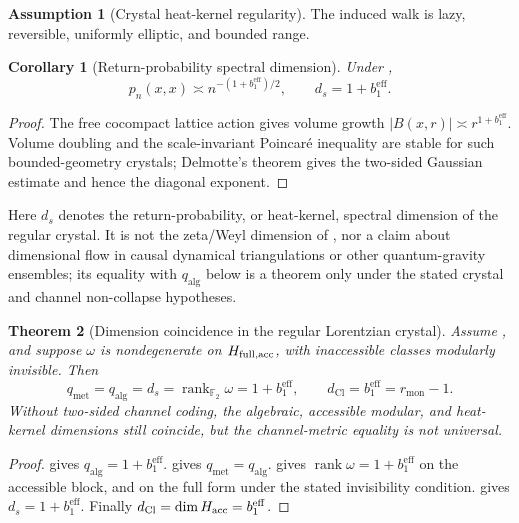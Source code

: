 \documentclass[11pt]{article}
\newtheorem{theorem}{Theorem}[section]
\newtheorem{corollary}[theorem]{Corollary}
\theoremstyle{definition}
\newtheorem{assumption}{Assumption}[section]
\theoremstyle{remark}
\newcommand{\F}{\mathbb{F}}
\newcommand{\qalg}{q_{\mathrm{alg}}}
\newcommand{\qmet}{q_{\mathrm{met}}}
\newcommand{\rmon}{r_{\mathrm{mon}}}
\newcommand{\dCl}{d_{\mathrm{Cl}}}
\newcommand{\ds}{d_s}
\newcommand{\beff}{b_1^{\mathrm{eff}}}
\newcommand{\rank}{\operatorname{rank}}
\begin{document}
\begin{assumption}[Crystal heat-kernel regularity]
\label{ass:crystal-heat-kernel}
The induced walk is lazy, reversible, uniformly elliptic, and bounded range.
\end{assumption}

\begin{corollary}[Return-probability spectral dimension]
\label{cor:return-spectral-dimension}
Under ,
\[
 p_n(x,x)\asymp n^{-(1+\beff)/2},
 \qquad
 \boxed{\ds=1+\beff.}
\]
\end{corollary}

\begin{proof}
The free cocompact lattice action gives volume growth
\(|B(x,r)|\asymp r^{1+\beff}\).  Volume doubling and the scale-invariant
Poincar\'e inequality are stable for such bounded-geometry crystals; Delmotte's
theorem \cite{delmotte1999} gives the two-sided Gaussian estimate and hence the
diagonal exponent.
\end{proof}

Here \(d_s\) denotes the return-probability, or heat-kernel, spectral dimension
of the regular crystal.  It is not the zeta/Weyl dimension of
, nor a claim about dimensional flow in causal dynamical
triangulations or other quantum-gravity ensembles; its equality with
\(\qalg\) below is a theorem only under the stated crystal and channel
non-collapse hypotheses.

\begin{theorem}[Dimension coincidence in the regular Lorentzian crystal]
\label{thm:dimension-coincidence}
Assume
, and suppose \(\omega\) is nondegenerate on
\(H_{\rm full,acc}\), with inaccessible classes modularly invisible.  Then
\[
 \boxed{
 \qmet=\qalg=\ds=\rank_{\F_2}\omega=1+\beff,
 \qquad
 \dCl=\beff=\rmon-1.
 }
\]
Without two-sided channel coding, the algebraic, accessible modular, and
heat-kernel dimensions still coincide, but the channel-metric equality is not
universal.
\end{theorem}

\begin{proof}
 gives
\(\qalg=1+\beff\).
 gives
\(\qmet=\qalg\).
 gives
\(\rank\omega=1+\beff\) on the accessible block, and on the full form under the
stated invisibility condition.
 gives
\(\ds=1+\beff\).
Finally \(\dCl=\dim H_{\rm acc}=\beff\).
\end{proof}
\end{document}
